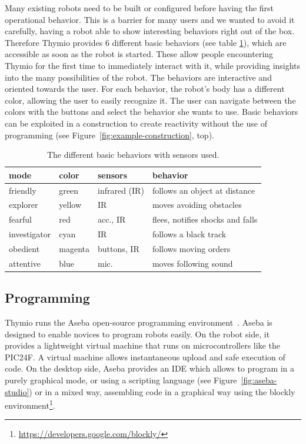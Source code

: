 \documentclass[letterpaper, 10 pt, conference]{ieeeconf}  %
\begin{document}
Many existing robots need to be built or configured before having the first operational behavior. 
This is a barrier for many users and we wanted to avoid it carefully, having a robot able to show interesting behaviors right out of the box.
Therefore Thymio provides 6 different basic behaviors (see table \ref{tbl:basic-behaviors}), which are accessible as soon as the robot is started.
These allow people encountering Thymio for the first time to immediately interact with it, while providing insights into the many possibilities of the robot.
The behaviors are interactive and oriented towards the user. %
For each behavior, the robot's body has a different color, allowing the user to easily recognize it.
The user can navigate between the colors with the buttons and select the behavior she wants to use.
Basic behaviors can be exploited in a construction to create reactivity without the use of programming (see Figure~\ref{fig:example-construction}, top).

\begin{table}
\begin{tabularx}{\columnwidth}{@{}llll@{}}
\toprule
mode & color & sensors & behavior \\
\midrule
friendly & green & infrared (IR) & follows an object at distance \\
explorer & yellow & IR & moves avoiding obstacles \\
fearful & red & acc., IR & flees, notifies shocks and falls \\
investigator & cyan & IR & follows a black track \\
obedient & magenta & buttons, IR & follows moving orders \\
attentive & blue & mic. & moves following sound \\
\bottomrule
\end{tabularx}
\caption{The different basic behaviors with sensors used.}
\label{tbl:basic-behaviors}
\end{table}


\subsection{Programming}
\label{sec:aseba}

Thymio runs the Aseba open-source programming environment~\cite{aseba}.
Aseba is designed to enable novices to program robots easily.
On the robot side, it provides a lightweight virtual machine that runs on microcontrollers like the PIC24F.
A virtual machine allows instantaneous upload and safe execution of code.
On the desktop side, Aseba provides an IDE which allows to program in a purely graphical mode, or using a scripting language (see Figure~\ref{fig:aseba-studio}) or in a mixed way, assembling code in a graphical way using the blockly environment\footnote{\url{https://developers.google.com/blockly/}}.
\end{document}
